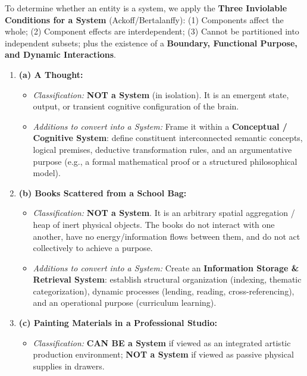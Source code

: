\begin{tcolorbox}[colback=white,colframe=seSecondary,title={\small \textbf{Model Solution for Q4 (W24 Midsem):}}]
To determine whether an entity is a system, we apply the \textbf{Three Inviolable Conditions for a System} (Ackoff/Bertalanffy): (1) Components affect the whole; (2) Component effects are interdependent; (3) Cannot be partitioned into independent subsets; plus the existence of a \textbf{Boundary, Functional Purpose, and Dynamic Interactions}.

\begin{enumerate}[leftmargin=1.5em, itemsep=4pt]
    \item \textbf{(a) A Thought:}
    \begin{itemize}[itemsep=1pt]
        \item \textit{Classification:} \textbf{NOT a System} (in isolation). It is an emergent state, output, or transient cognitive configuration of the brain.
        \item \textit{Additions to convert into a System:} Frame it within a \textbf{Conceptual / Cognitive System}: define constituent interconnected semantic concepts, logical premises, deductive transformation rules, and an argumentative purpose (e.g., a formal mathematical proof or a structured philosophical model).
    \end{itemize}
    \item \textbf{(b) Books Scattered from a School Bag:}
    \begin{itemize}[itemsep=1pt]
        \item \textit{Classification:} \textbf{NOT a System}. It is an arbitrary spatial aggregation / heap of inert physical objects. The books do not interact with one another, have no energy/information flows between them, and do not act collectively to achieve a purpose.
        \item \textit{Additions to convert into a System:} Create an \textbf{Information Storage \& Retrieval System}: establish structural organization (indexing, thematic categorization), dynamic processes (lending, reading, cross-referencing), and an operational purpose (curriculum learning).
    \end{itemize}
    \item \textbf{(c) Painting Materials in a Professional Studio:}
    \begin{itemize}[itemsep=1pt]
        \item \textit{Classification:} \textbf{CAN BE a System} if viewed as an integrated artistic production environment; \textbf{NOT a System} if viewed as passive physical supplies in drawers.

\end{itemize}
\end{enumerate}
\end{tcolorbox}
